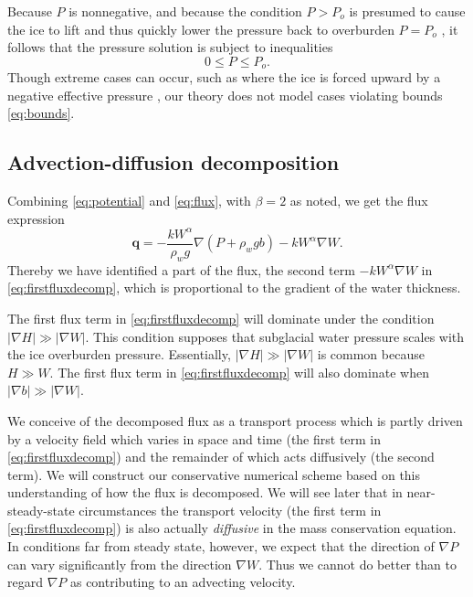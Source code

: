 \documentclass[11pt,final]{amsart}%
\newcommand\bq{\mathbf{q}}
\newcommand{\grad}{\nabla}
\begin{document}
Because $P$ is nonnegative, and because the condition $P>P_o$ is presumed to cause the ice to lift and thus quickly lower the pressure back to overburden $P=P_o$ \citep{Schoofetal2012}, it follows that the pressure solution is subject to inequalities
\begin{equation}
0 \le P \le P_o. \label{eq:bounds}
\end{equation}
Though extreme cases can occur, such as where the ice is forced upward by a negative effective pressure \citep{Schoofetal2012}, our theory does not model cases violating bounds \eqref{eq:bounds}.

\subsection*{Advection-diffusion decomposition}  Combining \eqref{eq:potential} and \eqref{eq:flux}, with $\beta=2$ as noted, we get the flux expression
\begin{equation}
  \bq = - \frac{k W^\alpha}{\rho_w g} \grad \left(P + \rho_w g b\right) - k W^\alpha \grad W. \label{eq:firstfluxdecomp}
\end{equation}
Thereby we have identified a part of the flux, the second term $-k W^\alpha \grad W$ in \eqref{eq:firstfluxdecomp}, which is proportional to the gradient of the water thickness.

The first flux term in \eqref{eq:firstfluxdecomp} will dominate under the condition $|\grad H| \gg |\grad W|$.  This condition supposes that subglacial water pressure scales with the ice overburden pressure.  Essentially, $|\grad H| \gg |\grad W|$ is common because $H\gg W$.  The first flux term in \eqref{eq:firstfluxdecomp} will also dominate when $|\grad b| \gg |\grad W|$. 

We conceive of the decomposed flux as a transport process which is partly driven by a velocity field which varies in space and time (the first term in \eqref{eq:firstfluxdecomp}) and the remainder of which acts diffusively (the second term).  We will construct our conservative numerical scheme based on this understanding of how the flux is decomposed.  We will see later that in near-steady-state circumstances the transport velocity (the first term in \eqref{eq:firstfluxdecomp}) is also actually \emph{diffusive} in the mass conservation equation.  In conditions far from steady state, however, we expect that the direction of $\grad P$ can vary significantly from the direction $\grad W$.  Thus we cannot do better than to regard $\grad P$ as contributing to an advecting velocity.
\end{document}
